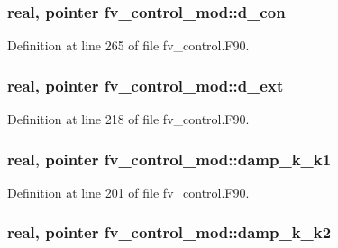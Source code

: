 \subsubsection[{d\-\_\-con}]{\setlength{\rightskip}{0pt plus 5cm}real, pointer fv\-\_\-control\-\_\-mod\-::d\-\_\-con\hspace{0.3cm}{\ttfamily [private]}}\label{classfv__control__mod_a3dcfeda51f7710fa74e8646d9c477dec}


Definition at line 265 of file fv\-\_\-control.\-F90.

\subsubsection[{d\-\_\-ext}]{\setlength{\rightskip}{0pt plus 5cm}real, pointer fv\-\_\-control\-\_\-mod\-::d\-\_\-ext\hspace{0.3cm}{\ttfamily [private]}}\label{classfv__control__mod_ac3f8891ff52f95a7ed8a495518ba3321}


Definition at line 218 of file fv\-\_\-control.\-F90.

\subsubsection[{damp\-\_\-k\-\_\-k1}]{\setlength{\rightskip}{0pt plus 5cm}real, pointer fv\-\_\-control\-\_\-mod\-::damp\-\_\-k\-\_\-k1\hspace{0.3cm}{\ttfamily [private]}}\label{classfv__control__mod_a58caca738b75ce861c8b4d95021207d7}


Definition at line 201 of file fv\-\_\-control.\-F90.

\subsubsection[{damp\-\_\-k\-\_\-k2}]{\setlength{\rightskip}{0pt plus 5cm}real, pointer fv\-\_\-control\-\_\-mod\-::damp\-\_\-k\-\_\-k2\hspace{0.3cm}{\ttfamily [private]}}\label{classfv__control__mod_a322872be8489e07ab3bda83ccdf28c6d}


